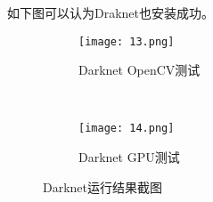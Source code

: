 \documentclass[openany]{ctexbook}
\begin{document}
如下图可以认为Draknet也安装成功。

\begin{figure*}[h]
    \centering
        \begin{subfigure}[h!]{0.5\textwidth}
            \centering
            \texttt{[image: 13.png]}
            \caption{Darknet OpenCV测试}
        \end{subfigure}%
        ~
        \begin{subfigure}[h!]{0.5\textwidth}
            \centering
            \texttt{[image: 14.png]}
            \caption{Darknet GPU测试}
        \end{subfigure}
        \caption{Darknet运行结果截图}
\end{figure*}
\end{document}
